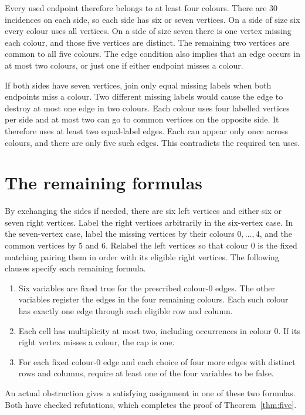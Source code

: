 \documentclass[10pt]{article}
\begin{document}
Every used endpoint therefore belongs to at least four colours. There are
30 incidences on each side, so each side has six or seven vertices. On a
side of size six every colour uses all vertices. On a side of size seven
there is one vertex missing each colour, and those five vertices are
distinct. The remaining two vertices are common to all five colours.
The edge condition also implies that an edge occurs in at most two
colours, or just one if either endpoint misses a colour.

If both sides have seven vertices, join only equal missing labels when
both endpoints miss a colour. Two different missing labels would cause
the edge to destroy at most one edge in two colours. Each colour uses four
labelled vertices per side and at most two can go to common vertices on
the opposite side. It therefore uses at least two equal-label edges. Each
can appear only once across colours, and there are only five such edges.
This contradicts the required ten uses.

\section{The remaining formulas}
By exchanging the sides if needed, there are six left vertices and either
six or seven right vertices. Label the right vertices arbitrarily in the
six-vertex case. In the seven-vertex case, label the missing vertices by
their colours \(0,\dots,4\), and the common vertices by 5 and 6. Relabel the
left vertices so that colour 0 is the fixed matching pairing them in order
with its eligible right vertices. The following clauses specify each
remaining formula.

\begin{enumerate}
\setlength{\itemsep}{0pt}
\item Six variables are fixed true for the prescribed colour-0 edges.
The other variables register the edges in the four remaining colours.
Each such colour has exactly one edge through each eligible row and column.
\item Each cell has multiplicity at most two, including occurrences in
colour 0. If its right vertex misses a colour, the cap is one.
\item For each fixed colour-0 edge and each choice of four more edges with
distinct rows and columns, require at least one of the four variables to
be false.
\end{enumerate}

An actual obstruction gives a satisfying assignment in one of these two
formulas. Both have checked refutations, which completes the proof of
Theorem~\ref{thm:five}.
\end{document}

